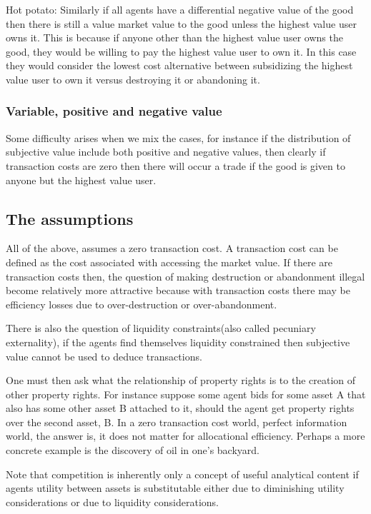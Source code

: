 \documentclass[12pt]{article}
\numberwithin{equation}{section}
\begin{document}
Hot potato: Similarly if all agents have a differential negative value of the good then there is still a value market value to the good unless the highest value user owns it. This is because if anyone other than the highest value user owns the good, they would be willing to pay the highest value user to own it. In this case they would consider the lowest cost alternative between subsidizing the highest value user to own it versus destroying it or abandoning it. 

\subsubsection{Variable, positive and negative value}

Some difficulty arises when we mix the cases, for instance if the distribution of subjective value include both positive and negative values, then clearly if transaction costs are zero then there will occur a trade if the good is given to anyone but the highest value user. 

\subsection{The assumptions}

All of the above, assumes a zero transaction cost. A transaction cost can be defined as the cost associated with accessing the market value. If there are transaction costs then, the question of making destruction or abandonment illegal become relatively more attractive because with transaction costs there may be efficiency losses due to over-destruction or over-abandonment. 

There is also the question of liquidity constraints(also called pecuniary externality), if the agents find themselves liquidity constrained then subjective value cannot be used to deduce transactions. 

One must then ask what the relationship of property rights is to the creation of other property rights. For instance suppose some agent bids for some asset A that also has some other asset B attached to it, should the agent get property rights over the second asset, B. In a zero transaction cost world, perfect information world, the answer is, it does not matter for allocational efficiency.  Perhaps a more concrete example is the discovery of oil in one's backyard. 

Note that competition is inherently only a concept of useful analytical content if agents utility between assets is substitutable either due to diminishing utility considerations or due to liquidity considerations. 
\end{document}
